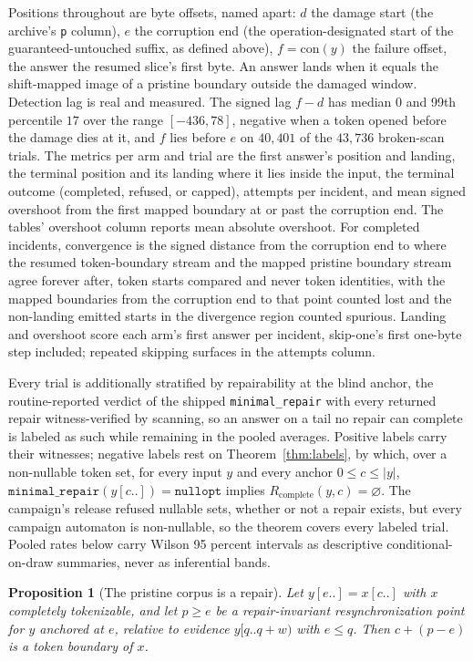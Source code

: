 \documentclass[11pt,a4paper]{article}
\theoremstyle{definition}
\theoremstyle{plain}
\newtheorem{proposition}{Proposition}
\theoremstyle{remark}
\newcommand{\code}[1]{\texttt{#1}}
\newcommand{\Rcomp}{R_{\mathrm{complete}}}
\newcommand{\suffix}[2]{#1[#2..]}
\newcommand{\window}[3]{#1[#2..#3)}
\begin{document}
Positions throughout are byte offsets, named apart: $d$ the damage start (the archive's \code{p} column), $e$ the
corruption end (the operation-designated start of the guaranteed-untouched suffix, as defined above),
$f = \mathrm{con}(y)$ the failure offset, the answer the resumed slice's first byte. An answer lands when it equals the
shift-mapped image of a pristine boundary outside the damaged window. Detection lag is real and measured. The signed lag
$f - d$ has median $0$ and 99th percentile $17$ over the range $[-436, 78]$, negative when a token opened before the
damage dies at it, and $f$ lies before $e$ on $40{,}401$ of the $43{,}736$ broken-scan trials. The metrics per arm and
trial are the first answer's position and landing, the terminal position and its landing where it lies inside the input,
the terminal outcome (completed, refused, or capped), attempts per incident, and mean signed overshoot from the first
mapped boundary at or past the corruption end. The tables' overshoot column reports mean absolute overshoot. For
completed incidents, convergence is the signed distance from the corruption end to where the resumed token-boundary
stream and the mapped pristine boundary stream agree forever after, token starts compared and never token identities,
with the mapped boundaries from the corruption end to that point counted lost and the non-landing emitted starts in the
divergence region counted spurious. Landing and overshoot score each arm's first answer per incident, skip-one's first
one-byte step included; repeated skipping surfaces in the attempts column.

Every trial is additionally stratified by repairability at the blind anchor, the routine-reported verdict of the shipped
\code{minimal\_repair} with every returned repair witness-verified by scanning, so an answer on a tail no repair can
complete is labeled as such while remaining in the pooled averages. Positive labels carry their witnesses; negative
labels rest on Theorem~\ref{thm:labels}, by which, over a non-nullable token set, for every input $y$ and every anchor
$0 \le c \le |y|$, $\code{minimal\_repair}(\suffix{y}{c}) = \code{nullopt}$ implies $\Rcomp(y, c) = \varnothing$. The
campaign's release refused nullable sets, whether or not a repair exists, but every campaign automaton is non-nullable,
so the theorem covers every labeled trial. Pooled rates below carry Wilson 95 percent intervals as descriptive
conditional-on-draw summaries, never as inferential bands.

\begin{proposition}[The pristine corpus is a repair]
\label{prop:oracle}
Let $y[e..] = x[c..]$ with $x$ completely tokenizable, and let $p \ge e$ be a repair-invariant resynchronization point
for $y$ anchored at $e$, relative to evidence $\window{y}{q}{q+w}$ with $e \le q$. Then $c + (p - e)$ is a token
boundary of $x$.
\end{proposition}
\end{document}
